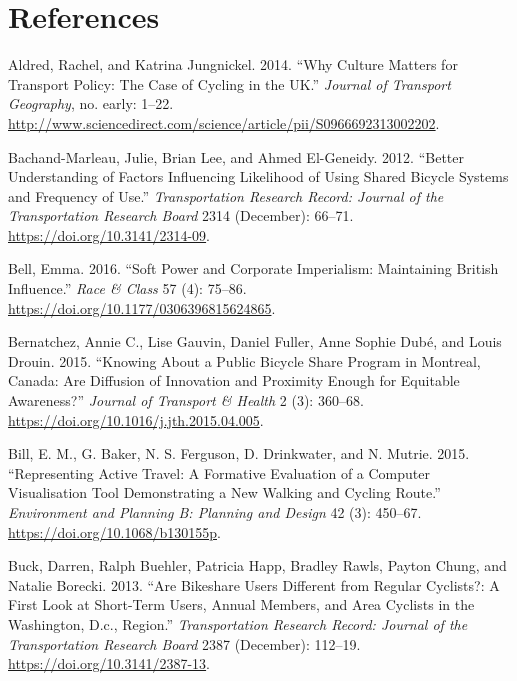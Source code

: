 \documentclass[
]{article}
\newlength{\cslhangindent}
\newenvironment{cslreferences}%
  {\setlength{\parindent}{0pt}%
  \everypar{\setlength{\hangindent}{\cslhangindent}}\ignorespaces}%
  {\par}
\begin{document}
\hypertarget{references}{%
\section*{References}\label{references}}

\hypertarget{refs}{}
\begin{cslreferences}
\leavevmode\hypertarget{ref-aldred_why_2014}{}%
Aldred, Rachel, and Katrina Jungnickel. 2014. ``Why Culture Matters for Transport Policy: The Case of Cycling in the UK.'' \emph{Journal of Transport Geography}, no. early: 1--22. \url{http://www.sciencedirect.com/science/article/pii/S0966692313002202}.

\leavevmode\hypertarget{ref-bachand-marleau_better_2012}{}%
Bachand-Marleau, Julie, Brian Lee, and Ahmed El-Geneidy. 2012. ``Better Understanding of Factors Influencing Likelihood of Using Shared Bicycle Systems and Frequency of Use.'' \emph{Transportation Research Record: Journal of the Transportation Research Board} 2314 (December): 66--71. \url{https://doi.org/10.3141/2314-09}.

\leavevmode\hypertarget{ref-bell_soft_2016}{}%
Bell, Emma. 2016. ``Soft Power and Corporate Imperialism: Maintaining British Influence.'' \emph{Race \& Class} 57 (4): 75--86. \url{https://doi.org/10.1177/0306396815624865}.

\leavevmode\hypertarget{ref-bernatchez_knowing_2015}{}%
Bernatchez, Annie C., Lise Gauvin, Daniel Fuller, Anne Sophie Dubé, and Louis Drouin. 2015. ``Knowing About a Public Bicycle Share Program in Montreal, Canada: Are Diffusion of Innovation and Proximity Enough for Equitable Awareness?'' \emph{Journal of Transport \& Health} 2 (3): 360--68. \url{https://doi.org/10.1016/j.jth.2015.04.005}.

\leavevmode\hypertarget{ref-bill_representing_2015}{}%
Bill, E. M., G. Baker, N. S. Ferguson, D. Drinkwater, and N. Mutrie. 2015. ``Representing Active Travel: A Formative Evaluation of a Computer Visualisation Tool Demonstrating a New Walking and Cycling Route.'' \emph{Environment and Planning B: Planning and Design} 42 (3): 450--67. \url{https://doi.org/10.1068/b130155p}.

\leavevmode\hypertarget{ref-buck_are_2013}{}%
Buck, Darren, Ralph Buehler, Patricia Happ, Bradley Rawls, Payton Chung, and Natalie Borecki. 2013. ``Are Bikeshare Users Different from Regular Cyclists?: A First Look at Short-Term Users, Annual Members, and Area Cyclists in the Washington, D.c., Region.'' \emph{Transportation Research Record: Journal of the Transportation Research Board} 2387 (December): 112--19. \url{https://doi.org/10.3141/2387-13}.


\end{cslreferences}
\end{document}
